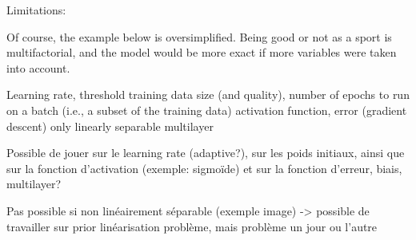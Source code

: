






\newpage
Limitations:

Of course, the example below is oversimplified. Being good or not as a sport is multifactorial, and the model would be more exact if more variables were taken into account. 

Learning rate, threshold
training data size (and quality), number of epochs to run on a batch (i.e., a subset of the training data)
activation function, error (gradient descent)
only linearly separable
multilayer

Possible de jouer sur le learning rate (adaptive?), sur les poids initiaux, ainsi que sur la fonction d'activation (exemple: sigmoïde) et sur la fonction d'erreur, biais, multilayer?

Pas possible si non linéairement séparable (exemple image) -> possible de travailler sur prior linéarisation problème, mais problème un jour ou l'autre



